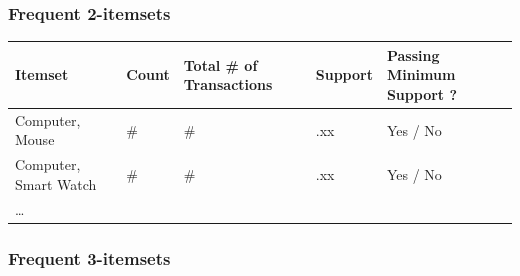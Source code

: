 \documentclass[
  letterpaper,
]{scrbook}
\newcounter{none} %
\begin{document}
\subsubsection*{Frequent 2-itemsets}\label{frequent-2-itemsets}

{\def\LTcaptype{none} %
\begin{longtable}[]{@{}
  >{\raggedright\arraybackslash}p{}
  >{\raggedright\arraybackslash}p{}
  >{\raggedright\arraybackslash}p{}
  >{\raggedright\arraybackslash}p{}
  >{\raggedright\arraybackslash}p{}@{}}
\toprule\noalign{}
\begin{minipage}[b]{\linewidth}\raggedright
Itemset
\end{minipage} & \begin{minipage}[b]{\linewidth}\raggedright
Count
\end{minipage} & \begin{minipage}[b]{\linewidth}\raggedright
Total \# of Transactions
\end{minipage} & \begin{minipage}[b]{\linewidth}\raggedright
Support
\end{minipage} & \begin{minipage}[b]{\linewidth}\raggedright
Passing Minimum Support ?
\end{minipage} \\
\midrule\noalign{}
\endhead
\bottomrule\noalign{}
\endlastfoot
Computer, Mouse & \# & \# & .xx & Yes / No \\
Computer, Smart Watch & \# & \# & .xx & Yes / No \\
\ldots{} & & & & \\
\end{longtable}
}

\subsubsection*{Frequent 3-itemsets}\label{frequent-3-itemsets}
\end{document}
